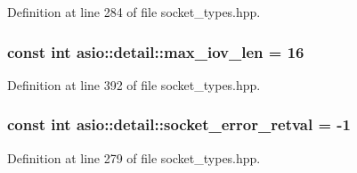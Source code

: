 Definition at line 284 of file socket\+\_\+types.\+hpp.

\hypertarget{namespaceasio_1_1detail_aa32324a2be9dbcadc7f55700d8d31df9}{}
\subsubsection[{max\+\_\+iov\+\_\+len}]{\setlength{\rightskip}{0pt plus 5cm}const int asio\+::detail\+::max\+\_\+iov\+\_\+len = 16}\label{namespaceasio_1_1detail_aa32324a2be9dbcadc7f55700d8d31df9}


Definition at line 392 of file socket\+\_\+types.\+hpp.

\hypertarget{namespaceasio_1_1detail_a8dfb40730cf1169dd3fa94e43a7abf89}{}
\subsubsection[{socket\+\_\+error\+\_\+retval}]{\setlength{\rightskip}{0pt plus 5cm}const int asio\+::detail\+::socket\+\_\+error\+\_\+retval = -\/1}\label{namespaceasio_1_1detail_a8dfb40730cf1169dd3fa94e43a7abf89}


Definition at line 279 of file socket\+\_\+types.\+hpp.

